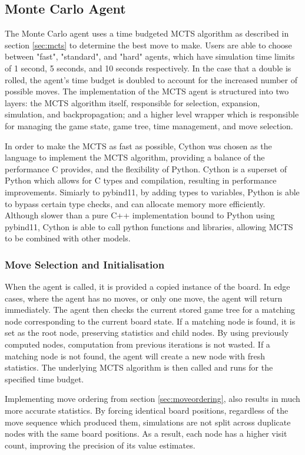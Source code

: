 \subsection{Monte Carlo Agent}
The Monte Carlo agent uses a time budgeted MCTS algorithm as described in section \ref{sec:mcts} to determine the best move to make. Users are able to choose between "fast", "standard", and "hard" agents, which have simulation time limits of 1 second, 5 seconds, and 10 seconds respectively. In the case that a double is rolled, the agent's time budget is doubled to account for the increased number of possible moves. The implementation of the MCTS agent is structured into two layers: the MCTS algorithm itself, responsible for selection, expansion, simulation, and backpropagation; and a higher level wrapper which is responsible for managing the game state, game tree, time management, and move selection.

In order to make the MCTS as fast as possible, Cython was chosen as the language to implement the MCTS algorithm, providing a balance of the performance C provides, and the flexibility of Python. Cython is a superset of Python which allows for C types and compilation, resulting in performance improvements. Simiarly to pybind11, by adding types to variables, Python is able to bypass certain type checks, and can allocate memory more efficiently. 
Although slower than a pure C++ implementation bound to Python using pybind11, Cython is able to call python functions and libraries, allowing MCTS to be combined with other models. 

\subsubsection{Move Selection and Initialisation}
When the agent is called, it is provided a copied instance of the board. In edge cases, where the agent has no moves, or only one move, the agent will return immediately. The agent then checks the current stored game tree for a matching node corresponding to the current board state. If a matching node is found, it is set as the root node, preserving statistics and child nodes. By using previously computed nodes, computation from previous iterations is not wasted. If a matching node is not found, the agent will create a new node with fresh statistics. The underlying MCTS algorithm is then called and runs for the specified time budget. 


Implementing move ordering from section \ref{sec:moveordering}, also results in much more accurate statistics. By forcing identical board positions, regardless of the move sequence which produced them, simulations are not split across duplicate nodes with the same board positions. As a result, each node has a higher visit count, improving the precision of its value estimates. 



